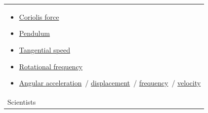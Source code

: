 \begin{longtable}[]{@{}
  >{\raggedright\arraybackslash}p{}@{}}
\begin{minipage}[t]{\linewidth}
\begin{itemize}
  \begin{itemize}
  \tightlist
  \item
    \href{https://en.wikipedia.org/wiki/Reactive_centrifugal_force}{reactive}
  \end{itemize}
\item
  \href{https://en.wikipedia.org/wiki/Coriolis_force}{Coriolis force}
\item
  \href{https://en.wikipedia.org/wiki/Pendulum_(mechanics)}{Pendulum}
\item
  \href{https://en.wikipedia.org/wiki/Tangential_speed}{Tangential speed}
\item
  \href{https://en.wikipedia.org/wiki/Rotational_frequency}{Rotational frequency}
\end{itemize}

\begin{itemize}
\tightlist
\item
  \href{https://en.wikipedia.org/wiki/Angular_acceleration}{Angular acceleration}{~}/{ }\href{https://en.wikipedia.org/wiki/Angular_displacement}{displacement}{~}/{ }\href{https://en.wikipedia.org/wiki/Angular_frequency}{frequency}{~}/{ }\href{https://en.wikipedia.org/wiki/Angular_velocity}{velocity}
\end{itemize}
\end{minipage} \\
\begin{minipage}[t]{\linewidth}\raggedright
Scientists


\end{minipage}
\end{longtable}

